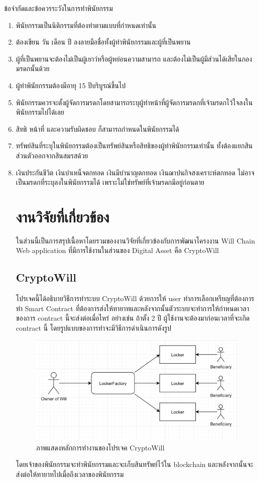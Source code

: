 \documentclass[12pt,oneside,openright,a4paper]{cpe-thai-project}
\begin{document}
ข้อจำกัดและข้อควรระวังในการทำพินัยกรรม
\begin{enumerate}[label=\arabic*.,leftmargin=0pt,itemindent=2.5cm]
\item พินัยกรรมเป็นนิติกรรมที่ต้องทำตามแบบที่กำหนดเท่านั้น
\item ต้องเขียน วัน เดือน ปี ลงลายมือชื่อทั้งผู้ทำพินัยกรรมและผู้ที่เป็นพยาน
\item ผู้ที่เป็นพยานจะต้องไม่เป็นผู้เยาว์หรือผู้หย่อนความสามารถ และต้องไม่เป็นผู้มีส่วนได้เสียในกองมรดกนั้นด้วย
\item ผู้ทำพินัยกรรมต้องมีอายุ 15 ปีบริบูรณ์ขึ้นไป
\item พินัยกรรมควรจะตั้งผู้จัดการมรดกโดยสามารถระบุผู้ทำหน้าที่ผู้จัดการมรดกที่เจ้ามรดกไว้ใจลงในพินัยกรรมไปได้เลย
\item สิทธิ หน้าที่ และความรับผิดชอบ ก็สามารถกำหนดในพินัยกรรมได้
\item ทรัพย์สินที่ระบุในพินัยกรรมต้องเป็นทรัพย์สินหรือสิทธิของผู้ทำพินัยกรรมเท่านั้น ทั้งต้องแยกสินส่วนตัวออกจากสินสมรสด้วย
\item เงินประกันชีวิต เงินบำเหน็จตกทอด เงินมีบำนาญตกทอด เงินฌาปนกิจสงเคราะห์ตกทอด ไม่อาจเป็นมรดกที่ระบุลงในพินัยกรรมได้ เพราะไม่ใช่ทรัพย์ที่เจ้ามรดกมีอยู่ก่อนตาย
\section{งานวิจัยที่เกี่ยวข้อง}
\tab ในส่วนนี้เป็นการสรุปเนื้อหาโดยรวมของงานวิจัยที่เกี่ยวข้องกับการพัฒนาโครงงาน Will Chain Web application ที่มีการใช้งานในส่วนของ Digital Asset คือ CryptoWill
\subsection{CryptoWill  \cite{cryptowill}}
\tab โปรเจคนี้ได้อธิบายวิธีการทำระบบ CryptoWill ด้วยการให้ user ทำการเลือกเหรียญที่ต้องการทำ Smart Contract ที่ต้องการส่งให้ทายาทและหลังจากนั้นตัวระบบจะทำการให้กำหนดเวลาของการ contract นี้จะส่งต่อเมื่อไหร่ อย่างเช่น ถ้าตั้ง 2 ปี ผู้ใช้งานจะต้องมาก่อนเวลาที่จะเกิด contract นี้ โดยรูปแบบของการทำจะมีวิธีการดำเนินการดังรูป

\begin{figure}[h]
	\centering
	\includegraphics[scale=0.6]{CryptoWill}
	\caption{ภาพแสดงหลักการทำงานของโปรเจค CryptoWill}
\end{figure}

โดยเจ้าของพินัยกรรมจะทำพินัยกรรมและจะเก็บสินทรัพย์ไว้ใน blockchain และหลังจากนั้นจะส่งต่อให้ทายาทไปเมื่อถึงเวลาของพินัยกรรม
\end{enumerate}
\end{document}
